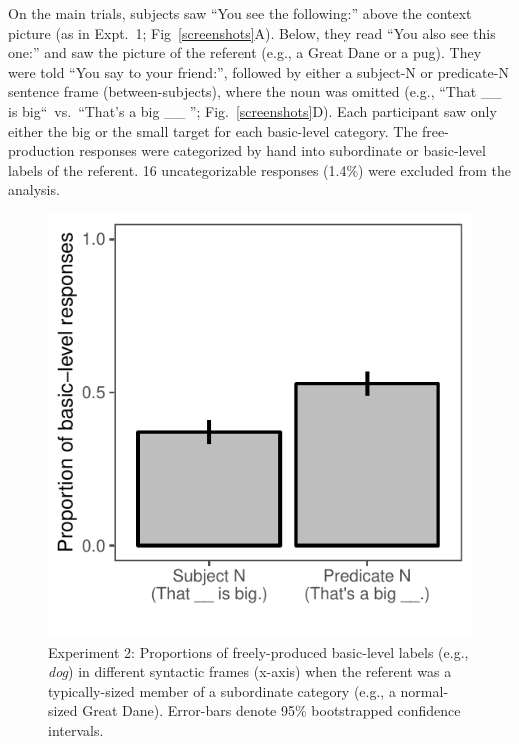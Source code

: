 \documentclass[a4paper,man,natbib]{apa6}
\begin{document}
On the main trials, subjects saw “You see the following:” above the context picture (as in Expt.~1; Fig~\ref{screenshots}A). Below, they read “You also see this one:” and saw the picture of the referent (e.g., a Great Dane or a pug). They were told “You say to your friend:”, followed by either a subject-N or predicate-N sentence frame (between-subjects), where the noun was omitted (e.g., “That \_\_ is big“~vs.~“That’s a big \_\_ ''; Fig.~\ref{screenshots}D). Each participant saw only either the big or the small target for each basic-level category. 
The free-production responses were categorized by hand into subordinate or basic-level labels of the referent. 16 uncategorizable responses (1.4\%) were excluded from the analysis.
\begin{figure}[t]
\begin{center}
\includegraphics[width=0.7\linewidth]{expt-np-prod-prereg-bars-revised.pdf}
\end{center}
\vspace{-0.3cm}
\caption{Experiment 2: Proportions of freely-produced basic-level labels (e.g., \emph{dog}) in different syntactic frames (x-axis) when the referent was a typically-sized member of a subordinate category (e.g., a normal-sized Great Dane). Error-bars denote 95\% bootstrapped confidence intervals.}
\vspace{-0.3cm}
\label{np-production}
\end{figure}
\end{document}
